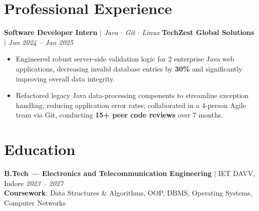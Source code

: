 \documentclass[a4paper,10pt]{article}
\begin{document}
\section*{Professional Experience}

\textbf{Software Developer Intern} $|$ \textit{Java $\cdot$ Git $\cdot$ Linux} \hfill \textbf{TechZest Global Solutions} $|$ \textit{Jun 2024 -- Jan 2025}
\begin{itemize}
  \item Engineered robust server-side validation logic for 2 enterprise Java web applications, decreasing invalid database entries by \textbf{30\%} and significantly improving overall data integrity.
  \item Refactored legacy Java data-processing components to streamline exception handling, reducing application error rates; collaborated in a 4-person Agile team via Git, conducting \textbf{15+ peer code reviews} over 7 months.
\end{itemize}

\section*{Education}
\textbf{B.Tech --- Electronics and Telecommunication Engineering} $|$ IET DAVV, Indore \hfill \textit{2023 -- 2027} \\
\textbf{Coursework}: Data Structures \& Algorithms, OOP, DBMS, Operating Systems, Computer Networks
\end{document}
